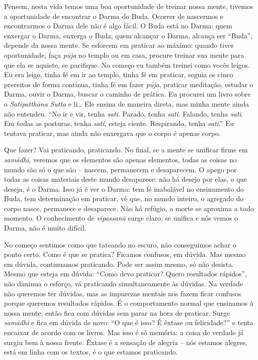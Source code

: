 Pensem, nesta vida temos uma boa oportunidade de treinar nossa
mente, tivemos a oportunidade de encontrar o Darma do Buda. Ocorrer de
nascermos e encontrarmos o Darma dele não é algo fácil. O Buda está no
Darma: quem enxergar o Darma, enxerga o Buda; quem alcançar o Darma,
alcança ser “Buda”, depende da nossa mente. Se esforcem em praticar ao
máximo: quando tiver oportunidade, faça \textit{pūja} no templo ou em
casa, procure treinar sua mente para que ela se aquiete, se pacifique.
No começo eu também treinei como vocês leigos. Eu era leigo, tinha fé
em ir ao templo, tinha fé em praticar, seguia os cinco preceitos de
forma contínua, tinha fé em fazer \textit{pūja}, praticar meditação,
estudar o Darma, ouvir o Darma, buscar o caminho de prática. Eu
procurei um livro sobre o \textit{Satipatthāna Sutta} e li… Ele
ensina de maneira direta, mas minha mente ainda não entendeu. “No ir e
vir, tenha \textit{sati}. Parado, tenha \textit{sati}. Falando, tenha
\textit{sati}. Em todas as posturas, tenha \textit{sati}, esteja
ciente. Respirando, tenha \textit{sati}.” Eu tentava praticar, mas
ainda não enxergava que o corpo é apenas corpo. 

Que fazer? Vai praticando, praticando. No final, se a mente se
unificar firme em \textit{samādhi}, veremos que os elementos são
apenas elementos, todas as coisas no mundo são só o que são – nascem,
permanecem e desaparecem. O apego por todas as coisas materiais deste
mundo desaparece: não há desejo por elas, o que deseja, é o Darma. Isso
já é ver o Darma: tem fé inabalável no ensinamento do Buda, tem
determinação em praticar, vê que, no mundo inteiro, o agregado do corpo
nasce, permanece e desaparece. Não há refúgio, a morte se aproxima a
todo momento. O conhecimento de \textit{vipassanā} surge claro, se
unifica e nós vemos o Darma, não é muito difícil. 

No começo sentimos como que tateando no escuro, não conseguimos
achar o ponto certo. Como é que se pratica? Ficamos confusos, em
dúvida. Mas mesmo em dúvida, continuamos praticando. Pode ser assim
mesmo, só não desista. Mesmo que esteja em dúvida: “Como devo praticar?
Quero resultados rápidos”, não diminua o esforço, vá praticando
simultaneamente às dúvidas. Na verdade não queremos ter dúvidas, mas as
impurezas mentais nos fazem ficar confusos porque queremos resultados
rápidos. É o comportamento normal que ensinamos à nossa mente, então
fica com dúvidas sem parar na hora de praticar. Surge
\textit{samādhi} e fica em dúvida de novo: “O que é isso? É êxtase ou
felicidade?” e tenta encaixar de acordo com os livros. Mas isso é só
memória: a coisa de verdade já surgiu bem à nossa frente. Êxtase é a
sensação de alegria – nós estamos alegres, está em linha com os textos,
é o que estamos praticando. 

